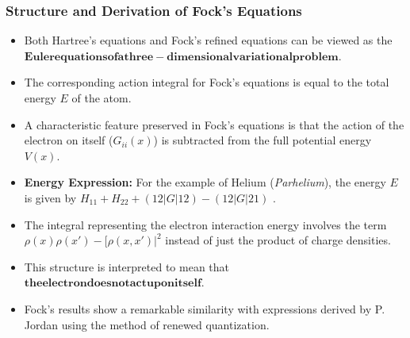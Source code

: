 \begin{frame}
    \frametitle{Structure and Derivation of Fock's Equations}
    \begin{itemize}
        \item Both Hartree's equations  and Fock's refined equations can be viewed as the $\mathbf{Euler equations of a three-dimensional variational problem}$.
        \item The corresponding action integral for Fock's equations is equal to the total energy $E$ of the atom.
        \item A characteristic feature preserved in Fock's equations is that the action of the electron on itself ($G_{ii}(x)$) is subtracted from the full potential energy $V(x)$.
        \item \textbf{Energy Expression:} For the example of Helium (\textit{Parhelium}), the energy $E$ is given by $H_{11} + H_{22} + (12|G|12) - (12|G|21)$ .
        \item The integral representing the electron interaction energy involves the term $\rho(x)\rho(x') - [\rho(x, x')|^2$ instead of just the product of charge densities.
        \item This structure is interpreted to mean that $\mathbf{the electron does not act upon itself}$.
        \item Fock’s results show a remarkable similarity with expressions derived by P. Jordan using the method of renewed quantization.
    \end{itemize}
\end{frame}

